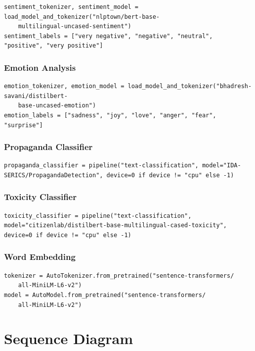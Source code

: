 \documentclass{article}
\begin{document}
\begin{lstlisting}
sentiment_tokenizer, sentiment_model = load_model_and_tokenizer("nlptown/bert-base-
	multilingual-uncased-sentiment")
sentiment_labels = ["very negative", "negative", "neutral", "positive", "very positive"]
\end{lstlisting}

\subsubsection{Emotion Analysis}

\begin{lstlisting}
emotion_tokenizer, emotion_model = load_model_and_tokenizer("bhadresh-savani/distilbert-
	base-uncased-emotion")
emotion_labels = ["sadness", "joy", "love", "anger", "fear", "surprise"]
\end{lstlisting}

\subsubsection{Propaganda Classifier}

\begin{lstlisting}
propaganda_classifier = pipeline("text-classification", model="IDA-SERICS/PropagandaDetection", device=0 if device != "cpu" else -1)
\end{lstlisting}

\subsubsection{Toxicity Classifier}

\begin{lstlisting}
toxicity_classifier = pipeline("text-classification", model="citizenlab/distilbert-base-multilingual-cased-toxicity", device=0 if device != "cpu" else -1)
\end{lstlisting}

\subsubsection{Word Embedding}

\begin{lstlisting}
tokenizer = AutoTokenizer.from_pretrained("sentence-transformers/
	all-MiniLM-L6-v2")
model = AutoModel.from_pretrained("sentence-transformers/
	all-MiniLM-L6-v2")
\end{lstlisting}
\newpage
	\section{Sequence Diagram}
	
\end{document}
